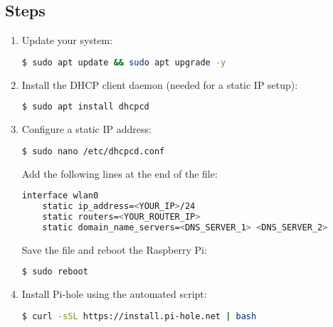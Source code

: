 \subsection{Steps}
\begin{enumerate}
    \item Update your system:
    \begin{lstlisting}[language=bash, breaklines=true, breakatwhitespace=true, columns=fullflexible]
    $ sudo apt update && sudo apt upgrade -y
    \end{lstlisting}

    \item Install the DHCP client daemon (needed for a static IP setup):
    \begin{lstlisting}[language=bash, breaklines=true, breakatwhitespace=true, columns=fullflexible]
    $ sudo apt install dhcpcd
    \end{lstlisting}
    
    \item Configure a static IP address:
    \begin{lstlisting}[language=bash, breaklines=true, breakatwhitespace=true, columns=fullflexible]
    $ sudo nano /etc/dhcpcd.conf
    \end{lstlisting}

    Add the following lines at the end of the file:
    \begin{lstlisting}[language=bash, breaklines=true, breakatwhitespace=true, columns=fullflexible]
    interface wlan0
    static ip_address=<YOUR_IP>/24
    static routers=<YOUR_ROUTER_IP>
    static domain_name_servers=<DNS_SERVER_1> <DNS_SERVER_2>
    \end{lstlisting}

    Save the file and reboot the Raspberry Pi:
    \begin{lstlisting}[language=bash, breaklines=true, breakatwhitespace=true, columns=fullflexible]
    $ sudo reboot
    \end{lstlisting}

    \item Install Pi-hole using the automated script:
    \begin{lstlisting}[language=bash, breaklines=true, breakatwhitespace=true, columns=fullflexible]
    $ curl -sSL https://install.pi-hole.net | bash
    \end{lstlisting}


\end{enumerate}

